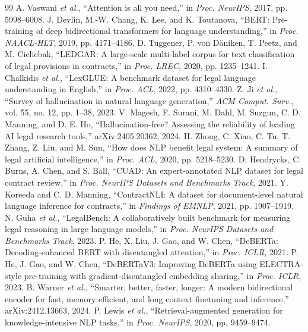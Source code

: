\documentclass[conference]{IEEEtran}
\begin{document}
\begin{thebibliography}{99}
\footnotesize
{} A. Vaswani \textit{et al.}, ``Attention is all you need,'' in \textit{Proc. NeurIPS}, 2017, pp. 5998--6008.
 J. Devlin, M.-W. Chang, K. Lee, and K. Toutanova, ``BERT: Pre-training of deep bidirectional transformers for language understanding,'' in \textit{Proc. NAACL-HLT}, 2019, pp. 4171--4186.
 D. Tuggener, P. von D\"aniken, T. Peetz, and M. Cieliebak, ``LEDGAR: A large-scale multi-label corpus for text classification of legal provisions in contracts,'' in \textit{Proc. LREC}, 2020, pp. 1235--1241.
 I. Chalkidis \textit{et al.}, ``LexGLUE: A benchmark dataset for legal language understanding in English,'' in \textit{Proc. ACL}, 2022, pp. 4310--4330.
 Z. Ji \textit{et al.}, ``Survey of hallucination in natural language generation,'' \textit{ACM Comput. Surv.}, vol. 55, no. 12, pp. 1--38, 2023.
 V. Magesh, F. Surani, M. Dahl, M. Suzgun, C. D. Manning, and D. E. Ho, ``Hallucination-free? Assessing the reliability of leading AI legal research tools,'' arXiv:2405.20362, 2024.
 H. Zhong, C. Xiao, C. Tu, T. Zhang, Z. Liu, and M. Sun, ``How does NLP benefit legal system: A summary of legal artificial intelligence,'' in \textit{Proc. ACL}, 2020, pp. 5218--5230.
 D. Hendrycks, C. Burns, A. Chen, and S. Ball, ``CUAD: An expert-annotated NLP dataset for legal contract review,'' in \textit{Proc. NeurIPS Datasets and Benchmarks Track}, 2021.
 Y. Koreeda and C. D. Manning, ``ContractNLI: A dataset for document-level natural language inference for contracts,'' in \textit{Findings of EMNLP}, 2021, pp. 1907--1919.
 N. Guha \textit{et al.}, ``LegalBench: A collaboratively built benchmark for measuring legal reasoning in large language models,'' in \textit{Proc. NeurIPS Datasets and Benchmarks Track}, 2023.
 P. He, X. Liu, J. Gao, and W. Chen, ``DeBERTa: Decoding-enhanced BERT with disentangled attention,'' in \textit{Proc. ICLR}, 2021.
 P. He, J. Gao, and W. Chen, ``DeBERTaV3: Improving DeBERTa using ELECTRA-style pre-training with gradient-disentangled embedding sharing,'' in \textit{Proc. ICLR}, 2023.
 B. Warner \textit{et al.}, ``Smarter, better, faster, longer: A modern bidirectional encoder for fast, memory efficient, and long context finetuning and inference,'' arXiv:2412.13663, 2024.
 P. Lewis \textit{et al.}, ``Retrieval-augmented generation for knowledge-intensive NLP tasks,'' in \textit{Proc. NeurIPS}, 2020, pp. 9459--9474.

\end{thebibliography}
\end{document}
